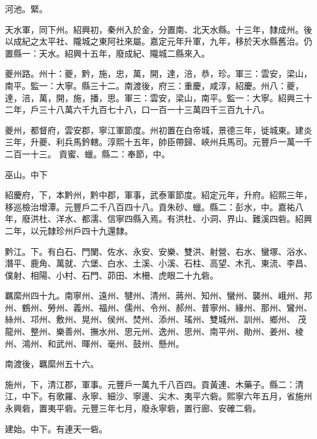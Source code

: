 \begin{pinyinscope}
 河池。緊。



 天水軍，同下州。紹興初，秦州入於金，分置南、北天水縣。十三年，隸成州。後以成紀之太平社、隴城之東阿社來屬。嘉定元年升軍，九年，移於天水縣舊治。仍置縣一：天水。紹興十五年，廢成紀、隴城二縣來入。



 夔州路。州十：夔，黔，施，忠，萬，開，達，涪，恭，珍。軍三：雲安，梁山，南平。監一：大寧。縣三十二。南渡後，府三：重慶，咸淳，紹慶。州八：夔，達，涪，萬，開，施，播，思。軍三：雲安，梁山，南平。監一：大寧。紹興三十二年，戶三十八萬六千九百七十八，口一百一十三萬四千三百九十八。



 夔州，都督府，雲安郡，寧江軍節度。州初置在白帝城，景德三年，徙城東。建炎三年，升夔、利兵馬鈐轄。淳熙十五年，帥臣帶歸、峽州兵馬司。元豐戶一萬一千二百一十三。
 貢蜜、蠟。縣二：奉節，中。



 巫山。中下



 紹慶府，下，本黔州，黔中郡，軍事，武泰軍節度。紹定元年，升府。紹熙三年，移巡檢治增潭。元豐戶二千八百四十八。貢朱砂、蠟。縣二：彭水，中。嘉祐八年，廢洪杜、洋水、都濡、信寧四縣入焉。有洪杜、小洞、界山、難溪四砦。紹興二年，以元隸珍州戶四十九還隸。



 黔江。下。有白石、門闌、佐水、永安、安樂、雙洪、射營、右水、蠻塚、浴水、潛平、鹿角、萬就、六堡、白水、土溪、小溪、石柱、高望、木孔、東流、李昌、僕射、相陽、小村、石門、茆田、木柵、虎眼二十九砦。



 羈縻州四十九。南寧州、遠州、犍州、清州、蔣州、知州、蠻州、襲州、峨州、邦州、鶴州、勞州、義州、福州、儒州、令州、郝州、普寧州、緣州、那州、鸞州、絲州、邛州、敷州、晃州、侯州、焚州、添州、瑤州、雙城州、訓州、鄉州、
 茂龍州、整州、樂善州、撫水州、思元州、逸州、思州、南平州、勛州、姜州、棱州、鴻州、和武州、暉州、毫州、鼓州、懸州。



 南渡後，羈縻州五十六。



 施州，下，清江郡，軍事。元豐戶一萬九千八百四。貢黃連、木藥子。縣二：清江，中下。有歌羅、永寧、細沙、寧邊、尖木、夷平六砦。熙寧六年五月，省施州永興砦，置夷平砦。元豐三年七月，廢永寧砦，置行廊、安確二砦。



 建始。中下。有連天一砦。




\end{pinyinscope}
